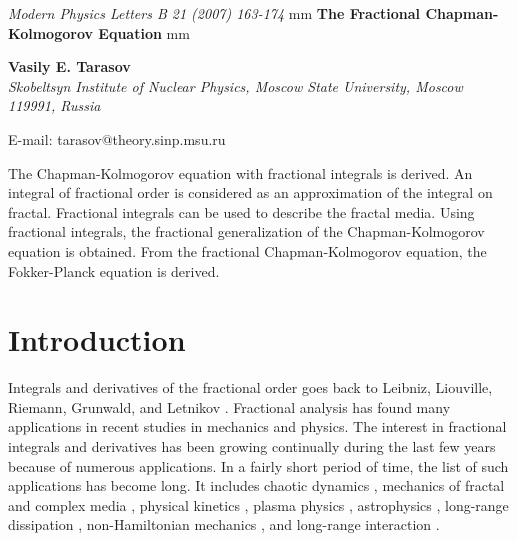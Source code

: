 \documentclass[12pt]{article}
\begin{document}
\begin{center}
{\it Modern Physics Letters B 21 (2007) 163-174}
 mm
{\large \bf The Fractional Chapman-Kolmogorov Equation}
 mm

{\large \bf Vasily E. Tarasov } \\

\vskip 3mm
{\it Skobeltsyn Institute of Nuclear Physics, 
Moscow State University, Moscow 119991, Russia}

E-mail: tarasov@theory.sinp.msu.ru
\end{center}

{\small
The Chapman-Kolmogorov equation with fractional integrals
is derived. An integral of fractional order 
is considered as an approximation of the integral on fractal. 
Fractional integrals can be used to describe the fractal media.
Using fractional integrals, the fractional generalization 
of the Chapman-Kolmogorov equation is obtained.  
From the fractional Chapman-Kolmogorov equation, the
Fokker-Planck equation is derived.}



\section{Introduction}


Integrals and derivatives of the fractional order goes back 
to Leibniz, Liouville, Riemann, Grunwald, and Letnikov \cite{SKM}. 
Fractional analysis has found many
applications in recent studies in mechanics and physics.
The interest in fractional integrals and derivatives 
has been growing continually 
during the last few years because of numerous applications. 
In a fairly short period of time, 
the list of such applications has become long. 
It includes chaotic dynamics \cite{Zaslavsky1,Zaslavsky2},
mechanics of fractal and complex media 
\cite{Mainardi,Media,Physica2005},
physical kinetics \cite{Zaslavsky1,Zaslavsky7,SZ},
plasma physics \cite{CLZ,ZM,Plasmas},  
astrophysics \cite{CMDA},
long-range dissipation \cite{GM,TZ2}, 
non-Hamiltonian mechanics \cite{nonHam,FracHam},
and long-range interaction \cite{Lask,TZ3,KZT}.
\end{document}

